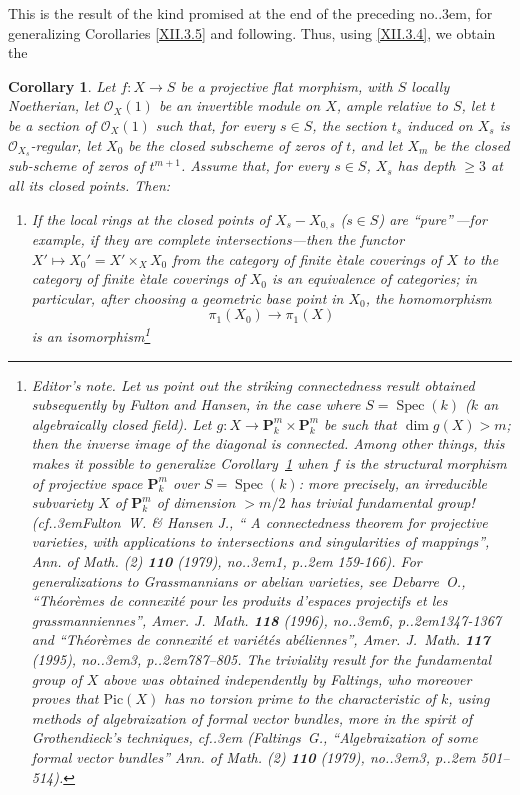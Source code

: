 \documentclass[11pt,a4paper,oneside]{book}
\providecommand{\sisi}[2]{#2}
\providecommand{\nde}[1]{\footnote{\textit{Editor's note.} #1}}
\providecommand{\og}{``}
\providecommand{\fg}{''\xspace}
\providecommand{\cf}{cf.\kern.3em}
\providecommand{\ptbl}{.\kern.2em}
\providecommand{\numero}{no.\kern.3em}
\providecommand{\Oo}{\mathcal O}
\providecommand{\PP}{\mathbf P}
\providecommand{\OX}{\mathcal O_X}
\providecommand{\Spec}{\operatorname{Spec}}
\providecommand{\mto}{\longmapsto}
\newenvironment{enumeratea}
  {\begin{enumerate}[label=\alph*)]}
  {\end{enumerate}}
\theoremstyle{plain}
\newtheorem{corollaire}[subsection]{Corollary}
\theoremstyle{definition}
\theoremstyle{remark}
\renewcommand{\Ref}[1]{\textup{\ref{#1}}}
\begin{document}
This is the result of the kind promised at the end of the preceding \sisi{N\textsuperscript{o}}{\numero}, for generalizing Corollaries \Ref{XII.3.5} and following. Thus, using \Ref{XII.3.4}, we obtain the

\begin{corollaire} \label{XII.4.9}
Let $f:X\to S$ be a projective flat morphism, with $S$ locally Noetherian, let $\OX(1)$ be an invertible module on $X$, ample relative to $S$, let $t$ be a section of $\OX(1)$ such that, for every $s\in S$, the section $t_s$ induced on $X_s$ is $\Oo_{X_s}$-regular, let $X_0$ be the closed subscheme of zeros of $t$, and let $X_m$ be the closed sub-\sisi{pre}{}scheme of zeros of $t^{m+1}$. Assume that, for every $s\in S$, $X_s$ has depth $\geq 3$ at all its closed points. Then:
\begin{enumeratea}
\item
If the local rings at the closed points of $X_s-X_{0,s}$ ($s\in S$) are \og pure\fg\,---for example, if they are complete intersections---then the functor $X'\mto X_0'=X'\times_X X_0$ from the category of finite \`etale coverings of $X$ to the category of finite \`etale coverings of $X_0$ is an equivalence of categories; in particular, after choosing a geometric base point in $X_0$, the homomorphism
\[
\pi_1(X_0)\to \pi_1(X)
\]
is an isomorphism\nde{\label{FH}Let us point out
the striking connectedness result obtained subsequently by Fulton and
Hansen, in the case where $S=\Spec(k)$ ($k$ an algebraically closed
field). Let $g:X\to {\PP^m_k}\times{\PP^m_k}$ be such that $\dim
g(X)>m$; then the inverse image of the diagonal is connected. Among
other things, this makes it possible to generalize
Corollary~\Ref{XII.4.9} when $f$ is the structural morphism
of projective space $\PP^m_k$ over $S=\Spec(k)$: more precisely, an
irreducible subvariety $X$ of ${\PP^m_k}$ of dimension $>m/2$ has
trivial fundamental group! (\cf Fulton~W. \& Hansen J., {\og
A connectedness theorem for projective varieties, with
applications to intersections and singularities of mappings\fg},
\emph{Ann. of Math. (2)} \textbf{110} (1979), \numero 1, p\ptbl
159-166). For generalizations to Grassmannians or
abelian varieties, see {Debarre~O.}, {\og Th\'eor\`emes de
connexit\'e pour les produits d'espaces projectifs et les
grassmanniennes\fg}, \emph{Amer. J.~Math.} \textbf{118} (1996),
\numero 6, p\ptbl 1347-1367 and {\og Th\'eor\`emes de connexit\'e et
vari\'et\'es ab\'eliennes\fg}, \emph{Amer. J.~Math.} \textbf{117}
(1995), \numero 3, p\ptbl 787--805. The triviality result for the
fundamental group of $X$ above was obtained independently
by Faltings, who moreover proves that
$\text{Pic}(X)$ has no torsion prime to the characteristic
of $k$, using methods of algebraization of formal vector bundles,
more in the spirit of Grothendieck's techniques, \cf
(Faltings~G., \og{Algebraization of some formal vector bundles\fg}
\emph{Ann. of Math. (2)} \textbf{110} (1979), \numero 3, p\ptbl
501--514).}


\end{enumeratea}
\end{corollaire}
\end{document}
